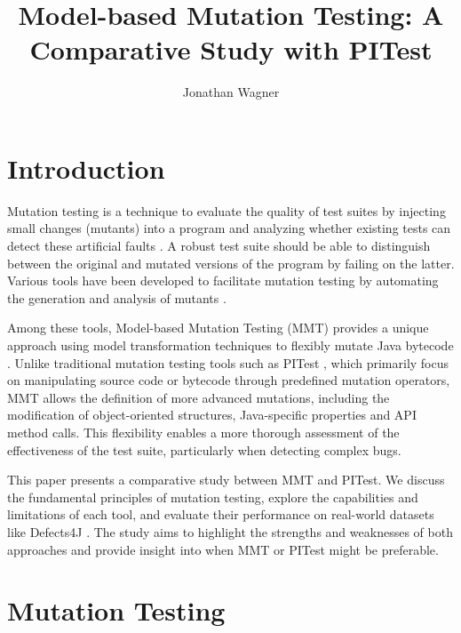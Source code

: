 \documentclass[sigplan, nonacm]{acmart}
\begin{document}
\title{Model-based Mutation Testing: A Comparative Study with PITest}

\author{Jonathan Wagner}

\maketitle

\section{Introduction}
Mutation testing is a technique to evaluate the quality of test suites by
injecting small changes (mutants) into a program and analyzing whether existing
tests can detect these artificial faults \cite{offutt_mutation_2001}. A robust
test suite should be able to distinguish between the original and mutated
versions of the program by failing on the latter. Various tools have been
developed to facilitate mutation testing by automating the generation and
analysis of mutants \cite{coles_pit_2016}.

Among these tools, Model-based Mutation Testing (MMT) provides a unique
approach using model transformation techniques to flexibly mutate Java bytecode
\cite{bockisch_mmt_2024, bockisch_mutation_2024}. Unlike traditional mutation
testing tools such as PITest \cite{coles_pit_2016}, which primarily focus on
manipulating source code or bytecode through predefined mutation operators,
MMT allows the definition of more advanced mutations, including the
modification of object-oriented structures, Java-specific properties and API
method calls. This flexibility enables a more thorough assessment of the
effectiveness of the test suite, particularly when detecting complex bugs.

This paper presents a comparative study between MMT and PITest. We discuss
the fundamental principles of mutation testing, explore the capabilities and
limitations of each tool, and evaluate their performance on real-world
datasets like Defects4J \cite{just_defects4j_2014}. The study aims to
highlight the strengths and weaknesses of both approaches and provide insight
into when MMT or PITest might be preferable.

\section{Mutation Testing}
\end{document}
